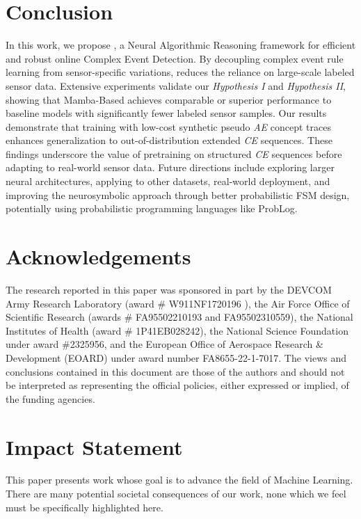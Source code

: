 \section{Conclusion}
In this work, we propose \narce{}, a Neural Algorithmic Reasoning framework for efficient and robust online Complex Event Detection. By decoupling complex event rule learning from sensor-specific variations, \narce{} reduces the reliance on large-scale labeled sensor data. Extensive experiments validate our \emph{Hypothesis I} and \emph{Hypothesis II}, showing that Mamba-Based \narce{} achieves comparable or superior performance to baseline models with significantly fewer labeled sensor samples. Our results demonstrate that training with low-cost synthetic pseudo \emph{AE} concept traces enhances generalization to out-of-distribution extended \emph{CE} sequences. These findings underscore the value of pretraining on structured \emph{CE} sequences before adapting to real-world sensor data. Future directions include exploring larger neural architectures, applying \narce{} to other datasets, real-world deployment, and improving the neurosymbolic approach through better probabilistic FSM design, potentially using probabilistic programming languages like ProbLog.


\section*{Acknowledgements}
The research reported in this paper was sponsored in part by the DEVCOM Army Research Laboratory (award \# W911NF1720196 ), the Air Force Office of Scientific Research (awards \#  FA95502210193 and FA95502310559), the National Institutes of Health (award \# 1P41EB028242), the National Science Foundation under award \#2325956, and the European Office of Aerospace Research \& Development (EOARD) under award number FA8655-22-1-7017. The views and conclusions contained in this document are those of the authors and should not be interpreted as representing the official policies, either expressed or implied, of the funding agencies.


\section*{Impact Statement}
This paper presents work whose goal is to advance the field of Machine Learning. There are many potential societal consequences of our work, none which we feel must be specifically highlighted here.